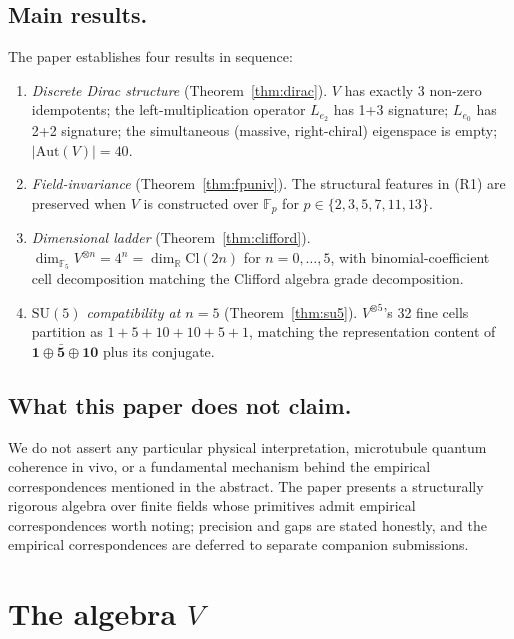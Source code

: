 \documentclass[11pt,reqno]{amsart}
\theoremstyle{plain}
\theoremstyle{definition}
\theoremstyle{remark}
\newcommand{\F}{\mathbb{F}}
\newcommand{\R}{\mathbb{R}}
\newcommand{\Cl}{\mathrm{Cl}}
\newcommand{\Aut}{\mathrm{Aut}}
\begin{document}
\subsection{Main results.} The paper establishes four results in
sequence:
\begin{enumerate}[label={(R\arabic*)}]
\item \emph{Discrete Dirac structure} (Theorem~\ref{thm:dirac}). $V$ has
exactly 3 non-zero idempotents; the left-multiplication operator $L_{e_2}$
has 1+3 signature; $L_{e_0}$ has 2+2 signature; the simultaneous (massive,
right-chiral) eigenspace is empty; $|\Aut(V)|=40$.

\item \emph{Field-invariance} (Theorem~\ref{thm:fpuniv}). The structural
features in (R1) are preserved when $V$ is constructed over $\F_p$ for
$p \in \{2,3,5,7,11,13\}$.

\item \emph{Dimensional ladder} (Theorem~\ref{thm:clifford}).
$\dim_{\F_5}V^{\otimes n} = 4^n = \dim_\R \Cl(2n)$ for $n=0,\ldots,5$,
with binomial-coefficient cell decomposition matching the Clifford
algebra grade decomposition.

\item \emph{$\mathrm{SU}(5)$ compatibility at $n=5$} (Theorem~\ref{thm:su5}).
$V^{\otimes 5}$'s 32 fine cells partition as $1+5+10+10+5+1$, matching the
representation content of $\mathbf{1} \oplus \bar{\mathbf{5}} \oplus
\mathbf{10}$ plus its conjugate.
\end{enumerate}

\subsection{What this paper does not claim.} We do not assert any
particular physical interpretation, microtubule quantum coherence in
vivo, or a fundamental mechanism behind the empirical correspondences
mentioned in the abstract. The paper presents a structurally rigorous
algebra over finite fields whose primitives admit empirical
correspondences worth noting; precision and gaps are stated honestly,
and the empirical correspondences are deferred to separate companion
submissions.

\section{The algebra $V$}
\label{sec:V}
\end{document}
